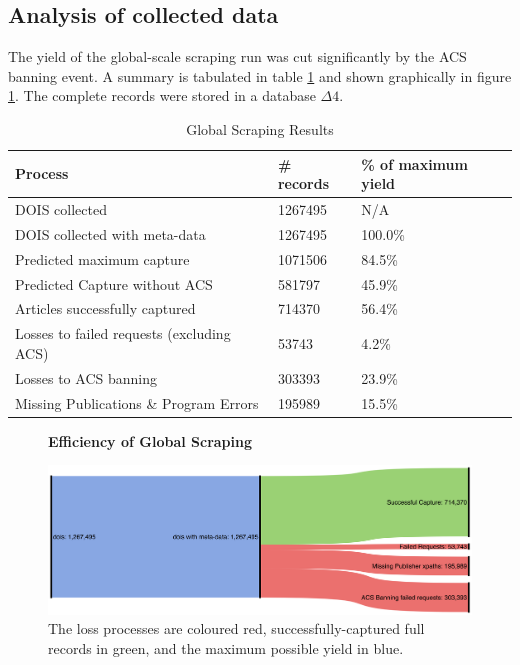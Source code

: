\subsection{Analysis of collected data}
The yield of the global-scale scraping run was cut significantly by the ACS banning event. A summary is tabulated in table \ref{tab:LARGESCRAPERES} and shown graphically in figure \ref{fig:LARGESANK}. The complete records were stored in a database $\Delta4$.
\begin{table}[h!]
\caption{Global Scraping Results}
\label{tab:LARGESCRAPERES}
\begin{center}
\begin{tabular}{||l|l|l||}
\hline
Process & \# records & \% of maximum yield\\
\hline
DOIS collected &  1267495 &N/A\\
DOIS collected with meta-data &  1267495 &100.0\%\\

\hline
Predicted maximum capture & 1071506 &  84.5\%\\
Predicted Capture without ACS & 581797 & 45.9\%\\
\hline
Articles successfully captured & 714370 & 56.4\%\\
Losses to failed requests (excluding ACS)& 53743 & 4.2\%\\
Losses to ACS banning & 303393 & 23.9\%\\
Missing Publications \& Program Errors & 195989 & 15.5\%\\
\hline
\end{tabular}
\end{center}
\end{table}
\begin{figure}[H]
    \centering
    \textbf{Efficiency of Global Scraping}\par\medskip
    \includegraphics[width=\textwidth]{Data_Acquisition/large_sankey.png}
    \caption[Efficiency of Large Scale Scraping]{The loss processes are coloured red, successfully-captured full records in green, and the maximum possible yield in blue.}
     \label{fig:LARGESANK}
\end{figure}

